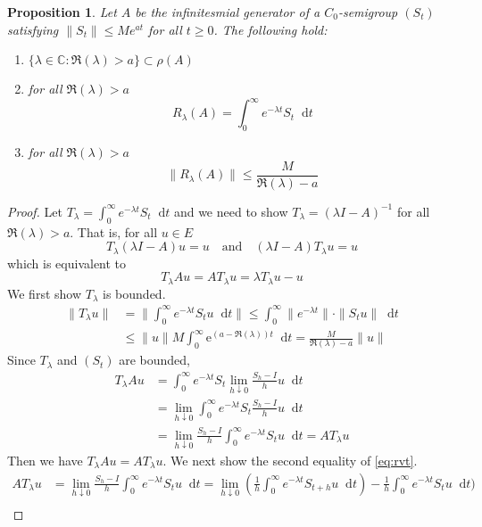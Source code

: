 \documentclass[12pt, reqno]{amsart}
\renewcommand{\leq}{\leqslant}
\renewcommand{\geq}{\geqslant}
\newcommand{\1}{\mathbbm 1}
\newcommand*\diff{\mathop{}\!\mathrm{d}}
\newcommand*\e{\mathrm{e}}
\theoremstyle{plain}
\newtheorem{proposition}[theorem]{Proposition}
\theoremstyle{definition}
\begin{document}
\begin{proposition} 
	Let $A$ be the infinitesmial generator of a $C_0$-semigroup $(S_t)$ satisfying $\| S_t\|\leq M e^{at}$ for all $t\geq 0$. The following hold:
	\begin{enumerate}
		\item $\{\lambda\in \mathbb{C}:\Re(\lambda)>a\}\subset \rho(A)$
		\item for all $\Re(\lambda)>a$
		$$R_{\lambda}(A)=\int_{0}^{\infty} e^{-\lambda t}S_t \diff t$$
		
		\item for all $\Re(\lambda)>a$
		$$\|R_{\lambda}(A)\|\leq\frac{M}{\Re(\lambda)-a}$$
	\end{enumerate}
\end{proposition}
\begin{proof}
	 Let $T_{\lambda}=\int_{0}^{\infty} e^{-\lambda t}S_t \diff t$ and we need to show $T_{\lambda}=(\lambda I-A)^{-1}$ for  all $\Re(\lambda)>a$. That is, for all $u\in E$
	 \begin{equation*}
	 	T_{\lambda}(\lambda I-A)u=u
	 	\quad \text{and} \quad
	 	(\lambda I-A)T_{\lambda}u=u
	 \end{equation*}
 which is equivalent to 
    \begin{equation}\label{eq:rvt}
   	T_{\lambda}Au=AT_{\lambda}u=\lambda T_{\lambda}u-u
     \end{equation}
 We first show $T_{\lambda}$ is bounded.
     \begin{align*}
 	\|T_{\lambda}u\|
 	&=\|\int_{0}^{\infty} e^{-\lambda t}S_tu \diff t\|\leq \int_{0}^{\infty} \|e^{-\lambda t} \|\cdot\|S_tu\| \diff t\\
 	&\leq  	\|u\|M\int_{0}^{\infty} \e^{(a-\Re(\lambda)) t} \diff   t=\frac{M}{\Re(\lambda)-a} \|u\| 
    \end{align*}
Since $T_{\lambda}$ and $(S_t)$ are bounded,
    \begin{align*}
    	T_{\lambda} Au
    	&=\int_{0}^{\infty} e^{-\lambda t}S_t \lim_{h \downarrow 0}\frac{S_h-I}{h}u\diff t\\
    	&=\lim_{h \downarrow 0}\int_{0}^{\infty} e^{-\lambda t}S_t \frac{S_h-I}{h}u\diff t\\
    	&=\lim_{h \downarrow 0}\frac{S_h-I}{h}\int_{0}^{\infty} e^{-\lambda t}S_t u\diff t=AT_{\lambda}u
    \end{align*}
Then we have $T_{\lambda} Au=AT_{\lambda}u$. We next show the second equality of \eqref{eq:rvt}.
   \begin{align*}
   AT_{\lambda}u&
   =\lim_{h \downarrow 0}\frac{S_h-I}{h}\int_{0}^{\infty} e^{-\lambda t}S_t u\diff t=\lim_{h \downarrow 0}(\frac{1}{h}\int_{0}^{\infty} e^{-\lambda t}S_{t+h} u\diff t)-\frac{1}{h}\int_{0}^{\infty} e^{-\lambda t}S_t u\diff t)\\

\end{align*}
\end{proof}
\end{document}
